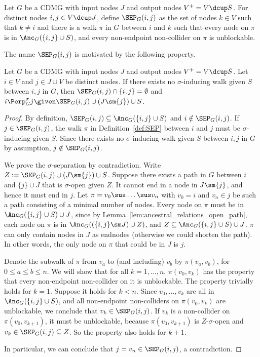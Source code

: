 \begin{Def}\label{def:SEP}
  Let $G$ be a CDMG with input nodes $J$ and output nodes $V^+ = V \dcup S$.
  For distinct nodes $i,j \in V \dcup J$,
  define $\SEP_G(i,j)$ as the set of nodes $k \in V$ such that
  $k \ne i$ and there is a walk $\pi$ in $G$ between $i$ and $k$ such that every node
  on $\pi$ is in $\Anc_G(\{i,j\}\cup S)$, and every non-endpoint non-collider on $\pi$ is unblockable.
\end{Def}
The name $\SEP_G(i,j)$ is motivated by the following property.
\begin{Prp}\label{prp:SEP}
  Let $G$ be a CDMG with input nodes $J$ and output nodes $V^+ = V \dcup S$.
  Let $i \in V$ and $j \in J \cup V$ be distinct nodes.
  If there exists no $\sigma$-inducing walk given $S$ between $i,j$ in $G$, then $\SEP_G(i,j) \cap \{i,j\} = \emptyset$ and $i \Perp^\sigma_G j \given \SEP_G(i,j) \cup (J \sm \{j\}) \cup S$.
\end{Prp}
\begin{proof}
  By definition, $\SEP_G(i,j) \subseteq \Anc_G(\{i,j\} \cup S)$ and $i \notin \SEP_G(i,j)$.
  If $j \in \SEP_G(i,j)$, the walk $\pi$ in Definition~\ref{def:SEP} between $i$ and $j$ must be $\sigma$-inducing given $S$.
  Since there exists no $\sigma$-inducing walk given $S$ between $i,j$ in $G$ by assumption, $j \notin \SEP_G(i,j)$.

  We prove the $\sigma$-separation by contradiction.
  Write $Z := \SEP_G(i,j) \cup (J \sm \{j\}) \cup S$.
  Suppose there exists a path in $G$ between $i$ and $\{j\} \cup J$ that is $\sigma$-open given $Z$.
  It cannot end in a node in $J \sm \{j\}$, and hence it must end in $j$.
  Let $\pi = v_0 \sus \dots \sus v_n$ with $v_0 = i$ and $v_n \in j$ be such a path consisting of a minimal number of nodes.
  Every node on $\pi$ must be in $\Anc_G(\{i,j\} \cup S) \cup J$, since by Lemma~\ref{lem:ancestral_relations_open_path}, each node on $\pi$ is in $\Anc_G((\{i,j\} \sm J)\cup Z)$, and $Z \subseteq \Anc_G(\{i,j\} \cup S) \cup J$.
  $\pi$ can only contain nodes in $J$ as endnodes (otherwise we could shorten the path).
  In other words, the only node on $\pi$ that could be in $J$ is $j$.

  Denote the subwalk of $\pi$ from $v_a$ to (and including) $v_b$ by $\pi(v_a,v_b)$, for $0 \le a \le b \le n$.
  We will show that for all $k = 1,\dots,n$, $\pi(v_0,v_k)$ has the property that every non-endpoint non-collider on it is unblockable.
  The property trivially holds for $k=1$. 
  Suppose it holds for $k < n$.
  Since $v_0,\dots,v_k$ are all in $\Anc_G(\{i,j\} \cup S)$, and all non-endpoint non-colliders on $\pi(v_0,v_k)$ are unblockable, we conclude that $v_k \in \SEP_G(i,j)$.
  If $v_{k}$ is a non-collider on $\pi(v_0,v_{k+1})$, it must be unblockable, because $\pi(v_0,v_{k+1})$ is $Z$-$\sigma$-open and $v_k \in \SEP_G(i,j) \subseteq Z$.
  So the property also holds for $k+1$.

  In particular, we can conclude that $j = v_n \in \SEP_G(i,j)$, a contradiction.
\end{proof}
